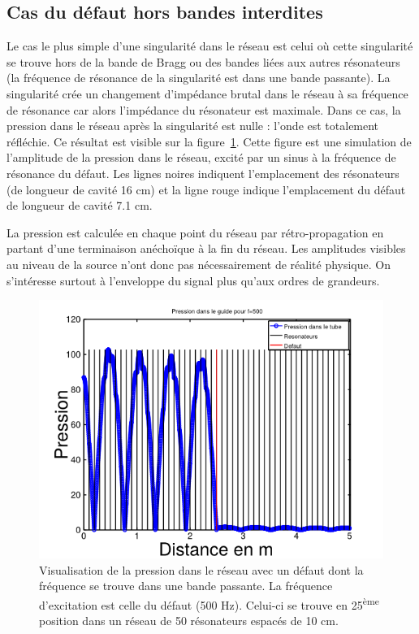 \subsection{Cas du défaut hors bandes interdites}

Le cas le plus simple d'une singularité dans le réseau est celui où cette singularité se trouve hors de la bande de Bragg ou des bandes liées aux autres résonateurs (la fréquence de résonance de la singularité est dans une bande passante). La singularité crée un changement d'impédance brutal dans le réseau à sa fréquence de résonance car alors l'impédance du résonateur est maximale. Dans ce cas, la pression dans le réseau après la singularité est nulle : l'onde est totalement réfléchie. Ce résultat est visible sur la figure~\ref{defaut_hb}. Cette figure est une simulation de l'amplitude de la pression dans le réseau, excité par un sinus à la fréquence de résonance du défaut.	Les lignes noires indiquent l'emplacement des résonateurs (de longueur de cavité 16 cm) et la ligne rouge indique l'emplacement du défaut de longueur de cavité 7.1 cm.

La pression est calculée en chaque point du réseau par rétro-propagation en partant d'une terminaison anéchoïque à la fin du réseau. Les amplitudes visibles au niveau de la source n'ont donc pas nécessairement de réalité physique. On s'intéresse surtout à l'enveloppe du signal plus qu'aux ordres de grandeurs.


\begin{figure}[!h]
\centering
\includegraphics[scale=0.5]{images_chp2/horsbande_50RH_500Hz_71mm.png}
\caption{\label{defaut_hb} Visualisation de la pression dans le réseau avec un défaut dont la fréquence se trouve dans une bande passante. La fréquence d'excitation est celle du défaut (500 Hz). Celui-ci se trouve en 25\textsuperscript{ème} position dans un réseau de 50 résonateurs espacés de 10 cm.}
\end{figure}

